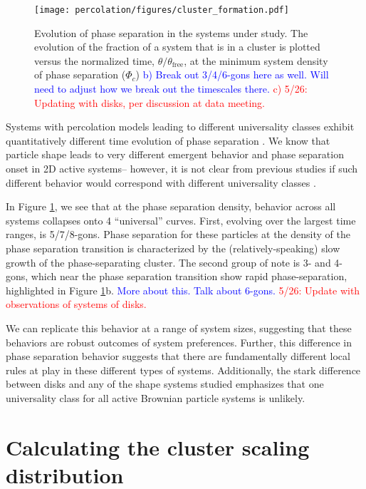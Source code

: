 \begin{figure}[t]
\begin{center}
\texttt{[image: percolation/figures/cluster\_formation.pdf]}
\caption{Evolution of phase separation in the systems under study.
The evolution of the fraction of a system that is in a cluster is plotted versus the normalized time, $\theta/\theta_\text{free}$, at the minimum system density of phase separation ($\Phi_c$)
\textcolor{blue}{b) Break out 3/4/6-gons here as well. Will need to adjust how we break out the timescales there.}
\textcolor{red}{c) 5/26: Updating with disks, per discussion at data meeting.}
}
\label{fig:cluster_formation}
\end{center}
\end{figure}

Systems with percolation models leading to different universality classes exhibit quantitatively different time evolution of phase separation \cite{percolation_papers}.
We know that particle shape leads to very different emergent behavior and phase separation onset in 2D active systems-- however, it is not clear from previous studies if such different behavior would correspond with different universality classes \cite{Moran_2020}.

In Figure \ref{fig:cluster_formation}, we see that at the phase separation density, behavior across all systems collapses onto 4 ``universal'' curves.
First, evolving over the largest time ranges, is 5/7/8-gons.
Phase separation for these particles at the density of the phase separation transition is characterized by the (relatively-speaking) slow growth of the phase-separating cluster.
The second group of note is 3- and 4-gons, which near the phase separation transition show rapid phase-separation, highlighted in Figure \ref{fig:cluster_formation}b.
\textcolor{blue}{More about this. Talk about 6-gons.}
\textcolor{red}{5/26: Update with observations of systems of disks.}

We can replicate this behavior at a range of system sizes, suggesting that these behaviors are robust outcomes of system preferences.
Further, this difference in phase separation behavior suggests that there are fundamentally different local rules at play in these different types of systems.
Additionally, the stark difference between disks and any of the shape systems studied emphasizes that one universality class for all active Brownian particle systems is unlikely.

\section{Calculating the cluster scaling distribution}


